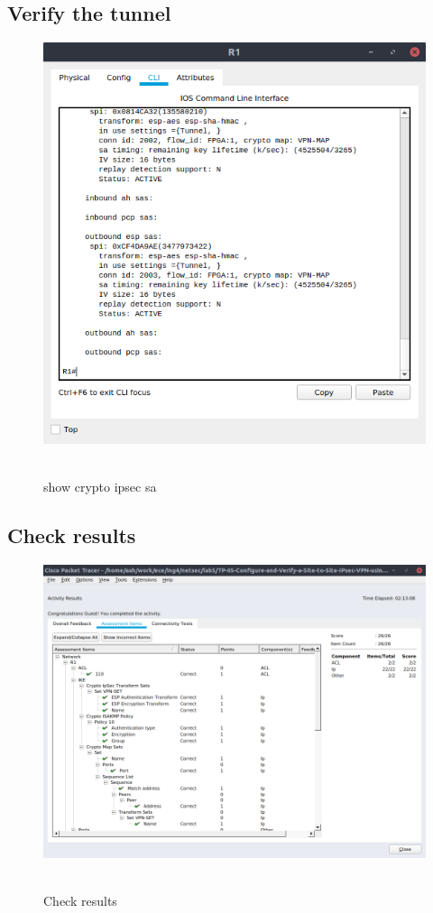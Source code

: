 \documentclass[12pt]{extarticle}
\begin{document}
\subsection{Verify the tunnel}
\begin{center}
\begin{figure}[H]
\includegraphics[scale=0.7]{resources/q35.png}\
\caption{show crypto ipsec sa}
\end{figure}
\end{center}

\subsection{Check results}
\begin{center}
\begin{figure}[H]
\includegraphics[scale=0.4]{resources/q36.png}\
\caption{Check results}
\end{figure}
\end{center}
\end{document}
